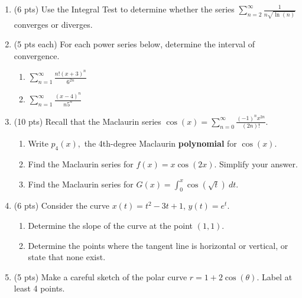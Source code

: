 \documentclass[12pt]{article}
\renewcommand{\emph}[1]{\textsf{\textbf{#1}}}
\begin{document}
\begin{enumerate}
\begin{enumerate}
	\vfill
	\end{enumerate}
\newpage
\item (6 pts) Use the Integral Test to determine whether the series $\displaystyle\sum_{n=2}^{\infty} \frac{1}{n \sqrt{\ln(n)}}$ converges or diverges.
\vfill
\newpage
\item (5 pts each) For each power series below, determine the interval of convergence.
	\begin{enumerate}
	\item $\displaystyle\sum_{n=1}^{\infty} \frac{n!(x+3)^n}{6^{2n}}$
	\vfill
	\item $\displaystyle\sum_{n=1}^{\infty} \frac{(x-4)^n}{n5^n}$
	\vfill
	\end{enumerate}
\newpage
\item (10 pts) Recall that the Maclaurin series \:\:\: $\displaystyle \cos(x) = \sum_{n=0}^\infty \frac{(-1)^n x^{2n}}{(2n)!}.$
	\begin{enumerate}
	\item Write $p_4(x),$ the 4th-degree Maclaurin \emph{polynomial} for $\cos(x).$
	\vfill
	\item Find the Maclaurin series for $f(x)=x \cos(2x).$ Simplify your answer.
	\vfill
	\item Find the Maclaurin series for $G(x) = \int_0^x \cos( \sqrt{t}) \: dt.$
	\vfill
	\vfill
	\end{enumerate}
\vfill
\newpage
\item (6 pts) Consider the curve $x(t) = t^2-3t+1$, $y(t) = e^t.$
\begin{enumerate}[label=(\alph*)]
\item Determine the slope of the curve at the point $(1,1)$.
\vfill
\item Determine the points where the tangent line is horizontal or vertical, or state that none exist.
\vfill
\end{enumerate}
\newpage
\item (5 pts) Make a careful sketch of the polar curve $r = 1 + 2\cos(\theta)$. Label at least 4 points.\\


\end{enumerate}
\end{document}
